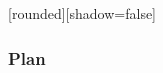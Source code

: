 {
  [rounded][shadow=false]
  \begin{frame}[plain]
  \end{frame}
}

% 
% 
% 
% 
% 
% 
% 
%     


\placelogotrue
\begin{frame}
  \frametitle{Plan}
  \begin{columns}[c]
    \begin{column}{0.5\textwidth}
      \tableofcontents[sections={1-2}]
    \end{column}
    \begin{column}{0.5\textwidth}
      \tableofcontents[sections={3-4}]
    \end{column}
  \end{columns}
\end{frame}
\placelogofalse